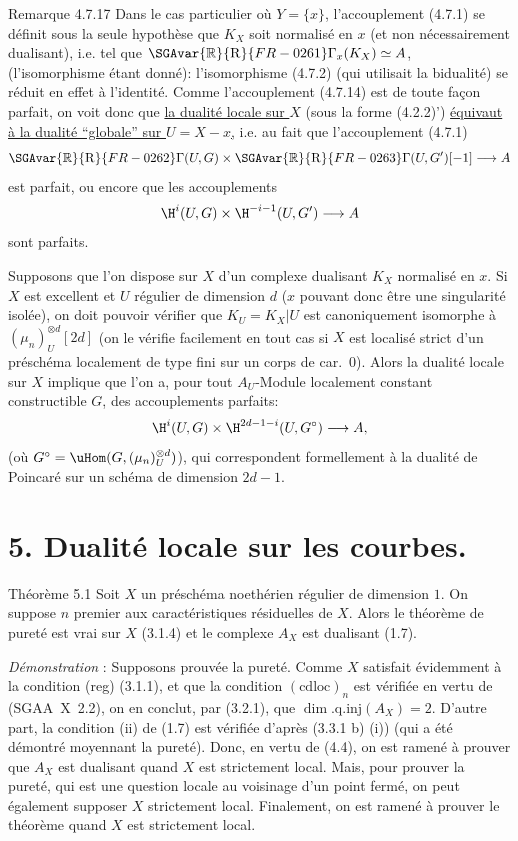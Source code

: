 \begin{statement}{Remarque 4.7.17}
Dans le cas particulier où $Y=\{x\}$, l'accouplement (4.7.1) se définit sous la seule hypothèse que $K_X$ soit normalisé en $x$ (et non nécessairement dualisant), i.e. tel que $\SGAvar{\mathbb{R}}{\mathrm{R}}{FR-0261}\Gamma_x(K_X)\simeq A$, (l'isomorphisme étant donné): l'isomorphisme (4.7.2) (qui utilisait la bidualité) se réduit en effet à l'identité. Comme l'accouplement (4.7.14) est de toute façon parfait, on voit donc que \underline{la dualité locale sur $X$} (sous la forme (4.2.2)') \underline{équivaut à la dualité ``globale'' sur $U=X-x$,} i.e. au fait que l'accouplement (4.7.1)
\[
\SGAvar{\mathbb{R}}{\mathrm{R}}{FR-0262}\Gamma(U,G)\times\SGAvar{\mathbb{R}}{\mathrm{R}}{FR-0263}\Gamma(U,G')[-1]\longrightarrow A
\]
est parfait, ou encore que les accouplements
\[
\H^i(U,G)\times\H^{-i-1}(U,G')\longrightarrow A
\]
sont parfaits.

Supposons que l'on dispose sur $X$ d'un complexe dualisant $K_X$ normalisé en $x$. Si $X$ est excellent et $U$ régulier de dimension $d$ ($x$ pouvant donc être une singularité isolée), on doit pouvoir vérifier que $K_U=K_X|U$ est canoniquement isomorphe à $(\mu_n)_U^{\otimes d}[2d]$ (on le vérifie facilement en tout cas si $X$ est localisé strict d'un préschéma localement de type fini sur un corps de car.~0). Alors la dualité locale sur $X$ implique que l'on a, pour tout $A_U$-Module localement constant constructible $G$, des accouplements parfaits:
\[
\H^i(U,G)\times\H^{2d-1-i}(U,G^\circ)\longrightarrow A,
\]
(où $G^\circ=\uHom(G,(\mu_n)_U^{\otimes d})$), qui correspondent formellement à la dualité de Poincaré sur un schéma de dimension $2d-1$.
\end{statement}

\section*{5. Dualité locale sur les courbes.}

\begin{statement}{Théorème 5.1}
Soit $X$ un préschéma noethérien régulier de dimension $1$. On suppose $n$ premier aux caractéristiques résiduelles de $X$. Alors le théorème de pureté est vrai sur $X$ (3.1.4) et le complexe $A_X$ est dualisant (1.7).
\end{statement}

\emph{Démonstration} : Supposons prouvée la pureté. Comme $X$ satisfait évidemment à la condition (reg) (3.1.1), et que la condition $(\mathrm{cdloc})_n$ est vérifiée en vertu de (SGAA~X~2.2), on en conclut, par (3.2.1), que $\dim.\mathrm{q.inj}(A_X)=2$. D'autre part, la condition (ii) de (1.7) est vérifiée d'après (3.3.1 b) (i)) (qui a été démontré moyennant la pureté). Donc, en vertu de (4.4), on est ramené à prouver que $A_X$ est dualisant quand $X$ est strictement local. Mais, pour prouver la pureté, qui est une question locale au voisinage d'un point fermé, on peut également supposer $X$ strictement local. Finalement, on est ramené à prouver le théorème quand $X$ est strictement local.

